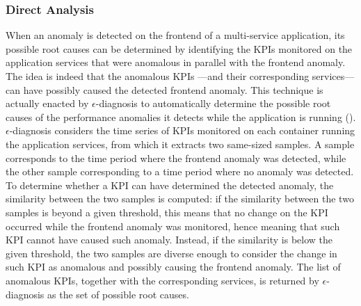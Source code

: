 \subsubsection{{Direct Analysis}}
When an anomaly is detected on the frontend of a multi-service application, its possible root causes can be determined by identifying the KPIs monitored on the application services that were anomalous in parallel with the frontend anomaly.
The idea is indeed that the anomalous KPIs ---and their corresponding services--- can have possibly caused the detected frontend anomaly.
This technique is actually enacted by $\epsilon$-diagnosis \cite{49_Shan2019_epsilonDiagnosis} to automatically determine the possible root causes of the performance anomalies it detects while the application is running ().
$\epsilon$-diagnosis \cite{49_Shan2019_epsilonDiagnosis} considers the time series of KPIs monitored on each container running the application services, from which it extracts two same-sized samples. 
A sample corresponds to the time period where the frontend anomaly was detected, while the other sample corresponding to a time period where no anomaly was detected.
To determine whether a KPI can have determined the detected anomaly, the similarity between the two samples is computed: if the similarity between the two samples is beyond a given threshold, this means that no change on the KPI occurred while the frontend anomaly was monitored, hence meaning that such KPI cannot have caused such anomaly. 
Instead, if the similarity is below the given threshold, the two samples are diverse enough to consider the change in such KPI as anomalous and possibly causing the frontend anomaly.
The list of anomalous KPIs, together with the corresponding services, is returned by $\epsilon$-diagnosis \cite{49_Shan2019_epsilonDiagnosis} as the set of possible root causes.

